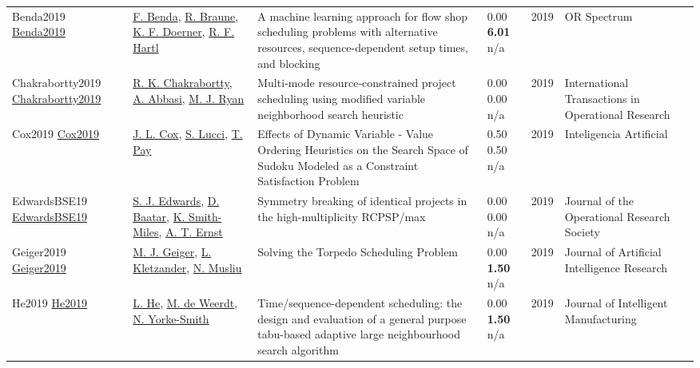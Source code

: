 {\begin{longtable}{p{3cm}p{5cm}p{10cm}p{1cm}rp{2.5cm}l}
Benda2019 \href{http://dx.doi.org/10.1007/s00291-019-00567-8}{Benda2019} & \hyperref[auth:a1966]{F. Benda}, \hyperref[auth:a1512]{R. Braune}, \hyperref[auth:a1967]{K. F. Doerner}, \hyperref[auth:a951]{R. F. Hartl} & \cellcolor{gold!20}A machine learning approach for flow shop scheduling problems with alternative resources, sequence-dependent setup times, and blocking & \noindent{}\textcolor{black!50}{0.00} \textbf{6.01} n/a & 2019 & OR Spectrum & \cite{Benda2019}\\
Chakrabortty2019 \href{http://dx.doi.org/10.1111/itor.12644}{Chakrabortty2019} & \hyperref[auth:a1614]{R. K. Chakrabortty}, \hyperref[auth:a1615]{A. Abbasi}, \hyperref[auth:a1616]{M. J. Ryan} & \cellcolor{gold!20}Multi‐mode resource‐constrained project scheduling using modified variable neighborhood search heuristic & \noindent{}\textcolor{black!50}{0.00} \textcolor{black!50}{0.00} n/a & 2019 & International Transactions in Operational Research & \cite{Chakrabortty2019}\\
Cox2019 \href{http://dx.doi.org/10.4114/intartif.vol22iss63pp1-15}{Cox2019} & \hyperref[auth:a1920]{J. L. Cox}, \hyperref[auth:a1921]{S. Lucci}, \hyperref[auth:a1922]{T. Pay} & \cellcolor{gold!20}Effects of Dynamic Variable - Value Ordering  Heuristics on the Search Space of Sudoku Modeled as a Constraint Satisfaction Problem & \noindent{}0.50 0.50 n/a & 2019 & Inteligencia Artificial & \cite{Cox2019}\\
EdwardsBSE19 \href{http://dx.doi.org/10.1080/01605682.2019.1595192}{EdwardsBSE19} & \hyperref[auth:a892]{S. J. Edwards}, \hyperref[auth:a893]{D. Baatar}, \hyperref[auth:a894]{K. Smith-Miles}, \hyperref[auth:a469]{A. T. Ernst} & Symmetry breaking of identical projects in the high-multiplicity RCPSP/max & \noindent{}\textcolor{black!50}{0.00} \textcolor{black!50}{0.00} n/a & 2019 & \cellcolor{red!20}Journal of the Operational Research Society & \cite{EdwardsBSE19}\\
Geiger2019 \href{http://dx.doi.org/10.1613/jair.1.11303}{Geiger2019} & \hyperref[auth:a1829]{M. J. Geiger}, \hyperref[auth:a78]{L. Kletzander}, \hyperref[auth:a45]{N. Musliu} & \cellcolor{gold!20}Solving the Torpedo Scheduling Problem & \noindent{}\textcolor{black!50}{0.00} \textbf{1.50} n/a & 2019 & Journal of Artificial Intelligence Research & \cite{Geiger2019}\\
He2019 \href{http://dx.doi.org/10.1007/s10845-019-01518-4}{He2019} & \hyperref[auth:a1547]{L. He}, \hyperref[auth:a308]{M. de Weerdt}, \hyperref[auth:a19]{N. Yorke-Smith} & \cellcolor{gold!20}Time/sequence-dependent scheduling: the design and evaluation of a general purpose tabu-based adaptive large neighbourhood search algorithm & \noindent{}\textcolor{black!50}{0.00} \textbf{1.50} n/a & 2019 & Journal of Intelligent Manufacturing & \cite{He2019}\\

\end{longtable}}
